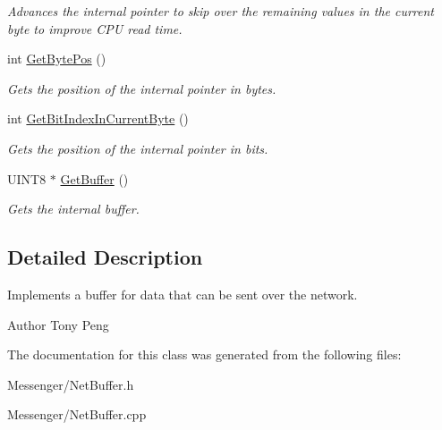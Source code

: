 \begin{DoxyCompactItemize}
\begin{DoxyCompactList}\small\item\em Advances the internal pointer to skip over the remaining values in the current byte to improve C\-P\-U read time. \end{DoxyCompactList}\item 
\hypertarget{class_rhesus_1_1_messenger_1_1_net_buffer_aedee90a5049558678700bc9a2d5c16a5}{int \hyperlink{class_rhesus_1_1_messenger_1_1_net_buffer_aedee90a5049558678700bc9a2d5c16a5}{Get\-Byte\-Pos} ()}\label{class_rhesus_1_1_messenger_1_1_net_buffer_aedee90a5049558678700bc9a2d5c16a5}

\begin{DoxyCompactList}\small\item\em Gets the position of the internal pointer in bytes. \end{DoxyCompactList}\item 
\hypertarget{class_rhesus_1_1_messenger_1_1_net_buffer_ad2212b7f38393e98fb2ad63113d4e82e}{int \hyperlink{class_rhesus_1_1_messenger_1_1_net_buffer_ad2212b7f38393e98fb2ad63113d4e82e}{Get\-Bit\-Index\-In\-Current\-Byte} ()}\label{class_rhesus_1_1_messenger_1_1_net_buffer_ad2212b7f38393e98fb2ad63113d4e82e}

\begin{DoxyCompactList}\small\item\em Gets the position of the internal pointer in bits. \end{DoxyCompactList}\item 
\hypertarget{class_rhesus_1_1_messenger_1_1_net_buffer_a97fe15d9a739c32287ee3b0b957745f4}{U\-I\-N\-T8 $\ast$ \hyperlink{class_rhesus_1_1_messenger_1_1_net_buffer_a97fe15d9a739c32287ee3b0b957745f4}{Get\-Buffer} ()}\label{class_rhesus_1_1_messenger_1_1_net_buffer_a97fe15d9a739c32287ee3b0b957745f4}

\begin{DoxyCompactList}\small\item\em Gets the internal buffer. \end{DoxyCompactList}\end{DoxyCompactItemize}


\subsection{Detailed Description}
Implements a buffer for data that can be sent over the network. 

\begin{DoxyAuthor}{Author}
Tony Peng 
\end{DoxyAuthor}


The documentation for this class was generated from the following files\-:\begin{DoxyCompactItemize}
\item 
Messenger/Net\-Buffer.\-h\item 
Messenger/Net\-Buffer.\-cpp\end{DoxyCompactItemize}
